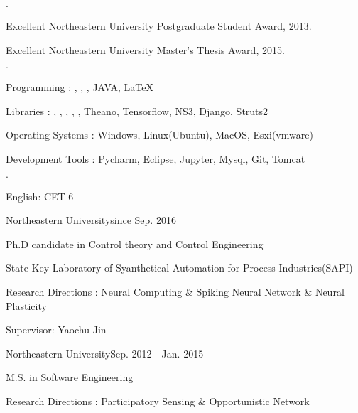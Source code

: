 \documentclass{joel_cv}
\begin{document}
%
%

\begin{sectionItemize}{$\cdot$}
	\item Excellent Northeastern University Postgraduate Student Award, 2013.
    \item Excellent Northeastern University Master's Thesis Award, 2015.
\end{sectionItemize}


%
%

\begin{sectionItemize}{$\cdot$}
	\item Programming : , , , JAVA, \LaTeX
	\item Libraries : , , , , , Theano, Tensorflow, NS3, Django, Struts2
    \item Operating Systems : Windows, Linux(Ubuntu), MacOS, Esxi(vmware)
    \item Development Tools : Pycharm, Eclipse, Jupyter, Mysql, Git, Tomcat
\end{sectionItemize}


%
%

\begin{sectionItemize}{$\cdot$}
	\item English: CET 6
\end{sectionItemize}


%
%
\newpage
{}
\begin{sectionContentSimple}{Northeastern University}{since Sep. 2016}
	\item Ph.D candidate in Control theory and Control Engineering
	\item State Key Laboratory of Syanthetical Automation for Process Industries(SAPI)
    \item Research Directions : Neural Computing \& Spiking Neural Network \& Neural Plasticity
	\item Supervisor: Yaochu Jin
\end{sectionContentSimple}

\begin{sectionContentSimple}{Northeastern University}{Sep. 2012 - Jan. 2015}
	\item M.S. in Software Engineering
	\item Research Directions : Participatory Sensing \& Opportunistic Network
\end{sectionContentSimple}
\end{document}
